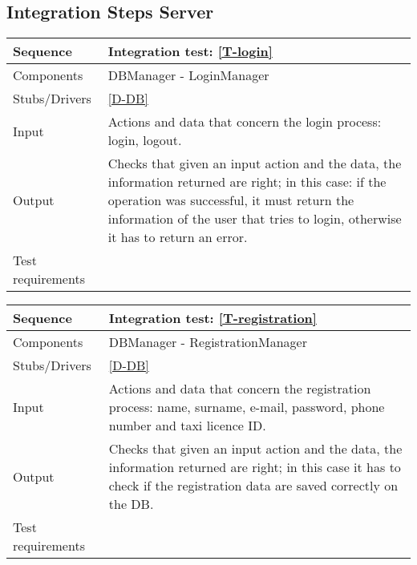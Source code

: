 \subsection{Integration Steps Server}


\begin{table}[H]
    \begin{tabularx}{\textwidth}{l|X}
        \hline
        Sequence
        & 
        Integration test: \ref{T-login}
        \\ \hline
        Components 
        & 
        DBManager - LoginManager
        \\ \hline
        Stubs/Drivers 
        & 
        \ref{D-DB}
        \\ \hline
        Input 
        & 
        Actions and data that concern the login process: login, logout.
        \\ \hline
        Output 
        & 
        Checks that given an input action and the data, the information returned are right; in this case: if the operation was successful, it must return the information of the user that tries to login, otherwise it has to return an error.
        \\ \hline
        Test requirements 
        & 
        
        \\ \hline
    \end{tabularx}
\end{table}

\begin{table}[H]
    \begin{tabularx}{\textwidth}{l|X}
        \hline
        Sequence
        & 
        Integration test: \ref{T-registration}
        \\ \hline
        Components 
        & 
        DBManager - RegistrationManager
        \\ \hline
        Stubs/Drivers 
        & 
        \ref{D-DB}
        \\ \hline
        Input 
        & 
        Actions and data that concern the registration process: name, surname, e-mail, password, phone number and taxi licence ID.
        \\ \hline
        Output 
        & 
        Checks that given an input action and the data, the information returned are right; in this case it has to check if the registration data  are saved correctly on the DB.
          \\ \hline
        Test requirements 
        & 
        
        \\ \hline
    \end{tabularx}
\end{table}

